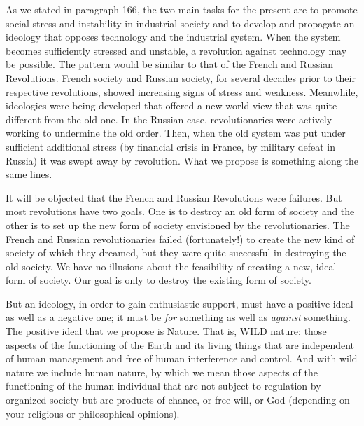  As we stated in paragraph 166, the two main tasks for the present are to promote social stress and instability in industrial society and to develop and propagate an ideology that opposes technology and the industrial system. When the system becomes sufficiently stressed and unstable, a revolution against technology may be possible. The pattern would be similar to that of the French and Russian Revolutions. French society and Russian society, for several decades prior to their respective revolutions, showed increasing signs of stress and weakness. Meanwhile, ideologies were being developed that offered a new world view that was quite different from the old one. In the Russian case, revolutionaries were actively working to undermine the old order. Then, when the old system was put under sufficient additional stress (by financial crisis in France, by military defeat in Russia) it was swept away by revolution. What we propose is something along the same lines.

 It will be objected that the French and Russian Revolutions were failures. But most revolutions have two goals. One is to destroy an old form of society and the other is to set up the new form of society envisioned by the revolutionaries. The French and Russian revolutionaries failed (fortunately!) to create the new kind of society of which they dreamed, but they were quite successful in destroying the old society. We have no illusions about the feasibility of creating a new, ideal form of society. Our goal is only to destroy the existing form of society.

 But an ideology, in order to gain enthusiastic support, must have a positive ideal as well as a negative one; it must be {\em for} something as well as {\em against} something. The positive ideal that we propose is Nature. That is, WILD nature: those aspects of the functioning of the Earth and its living things that are independent of human management and free of human interference and control. And with wild nature we include human nature, by which we mean those aspects of the functioning of the human individual that are not subject to regulation by organized society but are products of chance, or free will, or God (depending on your religious or philosophical opinions).

